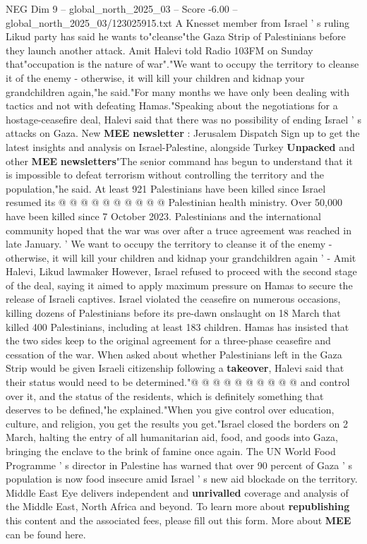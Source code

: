 \begin{textsample}{NEG Dim 9 – global\_north\_2025\_03 – Score -6.00 – global\_north\_2025\_03/123025915.txt}  \label{ex:f9_neg_067}
A Knesset member from Israel ' s ruling Likud party has said he wants to"cleanse"the Gaza Strip of Palestinians before they launch another attack.
Amit Halevi told Radio 103FM on Sunday that"occupation is the nature of war"."We want to occupy the territory to cleanse it of the enemy - otherwise, it will kill your children and kidnap your grandchildren again,"he said."For many months we have only been dealing with tactics and not with defeating Hamas."Speaking about the negotiations for a hostage-ceasefire deal, Halevi said that there was no possibility of ending Israel ' s attacks on Gaza.
New \textbf{MEE} \textbf{newsletter} : Jerusalem Dispatch Sign up to get the latest insights and analysis on Israel-Palestine, alongside Turkey \textbf{Unpacked} and other \textbf{MEE} \textbf{newsletters}"The senior command has begun to understand that it is impossible to defeat terrorism without controlling the territory and the population,"he said.
At least 921 Palestinians have been killed since Israel resumed its @ @ @ @ @ @ @ @ @ @ Palestinian health ministry.
Over 50,000 have been killed since 7 October 2023.
Palestinians and the international community hoped that the war was over after a truce agreement was reached in late January. ' We want to occupy the territory to cleanse it of the enemy - otherwise, it will kill your children and kidnap your grandchildren again ' - Amit Halevi, Likud lawmaker However, Israel refused to proceed with the second stage of the deal, saying it aimed to apply maximum pressure on Hamas to secure the release of Israeli captives.
Israel violated the ceasefire on numerous occasions, killing dozens of Palestinians before its pre-dawn onslaught on 18 March that killed 400 Palestinians, including at least 183 children.
Hamas has insisted that the two sides keep to the original agreement for a three-phase ceasefire and cessation of the war.
When asked about whether Palestinians left in the Gaza Strip would be given Israeli citizenship following a \textbf{takeover}, Halevi said that their status would need to be determined."@ @ @ @ @ @ @ @ @ @ and control over it, and the status of the residents, which is definitely something that deserves to be defined,"he explained."When you give control over education, culture, and religion, you get the results you get."Israel closed the borders on 2 March, halting the entry of all humanitarian aid, food, and goods into Gaza, bringing the enclave to the brink of famine once again.
The UN World Food Programme ' s director in Palestine has warned that over 90 percent of Gaza ' s population is now food insecure amid Israel ' s new aid blockade on the territory.
Middle East Eye delivers independent and \textbf{unrivalled} coverage and analysis of the Middle East, North Africa and beyond.
To learn more about \textbf{republishing} this content and the associated fees, please fill out this form.
More about \textbf{MEE} can be found here.

\end{textsample}
